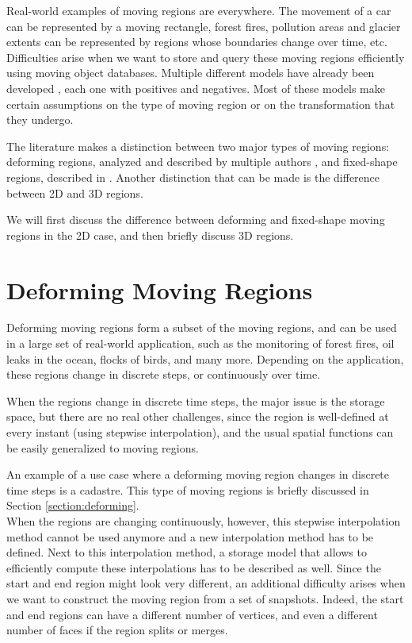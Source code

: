 \label{section:moving_regions}

Real-world examples of moving regions are everywhere. The movement of a car can be represented by a moving rectangle, forest fires, pollution areas and glacier extents can be represented by regions whose boundaries change over time, etc. Difficulties arise when we want to store and query these moving regions efficiently using moving object databases. Multiple different models have already been developed \cite{fmregion,polyhedra,model_structure_for_mod}, each one with positives and negatives. Most of these models make certain assumptions on the type of moving region or on the transformation that they undergo.

The literature makes a distinction between two major types of moving regions: deforming regions, analyzed and described by multiple authors \cite{polyhedra,model_structure_for_mod,moving_obj_foundation}, and fixed-shape regions, described in \cite{fmregion}. Another distinction that can be made is the difference between 2D and 3D regions. 

We will first discuss the difference between deforming and fixed-shape moving regions in the 2D case, and then briefly discuss 3D regions.

\section{Deforming Moving Regions}
\label{section:deforming_regions}

Deforming moving regions form a subset of the moving regions, and can be used in a large set of real-world application, such as the monitoring of forest fires, oil leaks in the ocean, flocks of birds, and many more. Depending on the application, these regions change in discrete steps, or continuously over time. 

When the regions change in discrete time steps, the major issue is the storage space, but there are no real other challenges, since the region is well-defined at every instant (using stepwise interpolation), and the usual spatial functions can be easily generalized to moving regions.

An example of a use case where a deforming moving region changes in discrete time steps is a cadastre. This type of moving regions is briefly discussed in Section \ref{section:deforming}. \\

When the regions are changing continuously, however, this stepwise interpolation method cannot be used anymore and a new interpolation method has to be defined. Next to this interpolation method, a storage model that allows to efficiently compute these interpolations has to be described as well. Since the start and end region might look very different, an additional difficulty arises when we want to construct the moving region from a set of snapshots. Indeed, the start and end regions can have a different number of vertices, and even a different number of faces if the region splits or merges.

